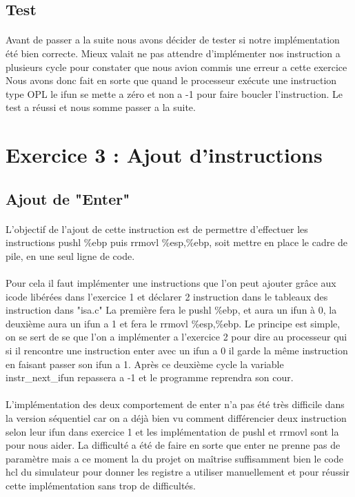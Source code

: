 \documentclass[12pt]{article}
\begin{document}
\subsection{Test} 
\paragraph{} Avant de passer a la suite nous avons décider de tester si notre implémentation été bien correcte. Mieux valait ne pas attendre d’implémenter nos instruction a plusieurs cycle pour constater que nous avion commis une erreur a cette exercice
Nous avons donc fait en sorte que quand le processeur exécute une instruction type OPL le ifun se mette a zéro et non a -1 pour faire boucler l'instruction. Le test a réussi et nous somme passer a la suite.

\newpage
\section{Exercice 3 : Ajout d'instructions}
\subsection{Ajout de "Enter"}

\paragraph{}L'objectif de l'ajout de cette instruction est de permettre d'effectuer les instructions pushl \%ebp puis rrmovl \%esp,\%ebp, soit mettre en place le cadre de pile, en une seul ligne de code.

\paragraph{}Pour cela il faut implémenter une instructions que l'on peut ajouter grâce aux icode libérées dans l'exercice 1 et déclarer 2 instruction dans le tableaux des instruction dans "isa.c" La première fera le pushl \%ebp, et aura un ifun à 0, la deuxième aura un ifun a 1 et fera le rrmovl \%esp,\%ebp. Le principe est simple, on se sert de se que l'on a implémenter a l’exercice 2 pour dire au processeur qui si il rencontre une instruction enter avec un ifun a 0 il garde la même instruction en faisant passer son ifun a 1. Après ce deuxième cycle la variable instr\_next\_ifun repassera a -1 et le programme reprendra son cour. 

\paragraph{}L'implémentation des deux comportement de enter n'a pas été très difficile dans la version séquentiel car on a déjà bien vu comment différencier deux instruction selon leur ifun dans exercice 1 et les implémentation de pushl et rrmovl sont la pour nous aider. La difficulté a été de faire en sorte que enter ne prenne pas de paramètre mais a ce moment la du projet on maîtrise suffisamment bien le code hcl du simulateur pour donner les registre a utiliser manuellement et pour réussir cette implémentation sans trop de difficultés.
\end{document}
